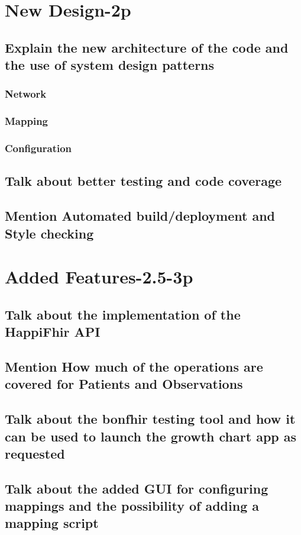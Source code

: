 \documentclass[sigconf]{acmart}
\begin{document}
\section{New Design-2p}
\subsection{Explain the new architecture of the code and the use of system design patterns}
\subsubsection{Network}
\subsubsection{Mapping}
\subsubsection{Configuration}
\subsection{Talk about better testing and code coverage}
\subsection{Mention Automated build/deployment and Style checking}

\section{Added Features-2.5-3p} 
\subsection{Talk about the implementation of the HappiFhir API}
\subsection{Mention How much of the operations are covered for Patients and Observations}
\subsection{Talk about the bonfhir testing tool and how it can be used to launch the growth chart app as requested}
\subsection{Talk about the added GUI for configuring mappings and the possibility of adding a mapping script}
\end{document}
